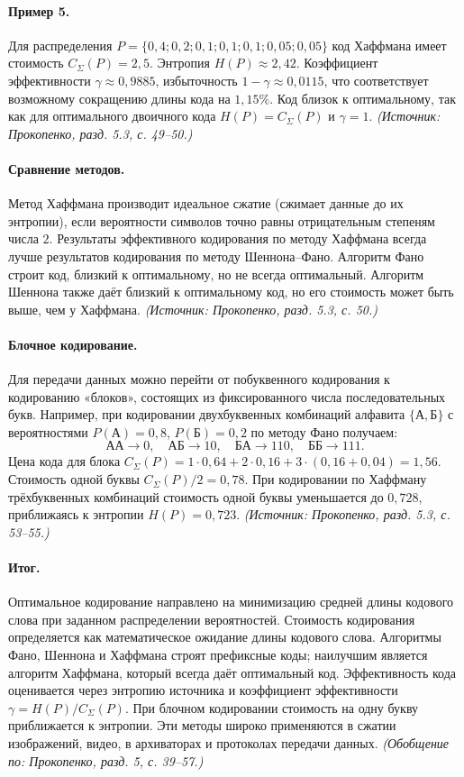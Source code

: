 \documentclass[a4paper,12pt]{article}
\begin{document}
\paragraph{Пример 5.}
Для распределения \(P=\{0{,}4;0{,}2;0{,}1;0{,}1;0{,}1;0{,}05;0{,}05\}\) код Хаффмана имеет стоимость \(C_\Sigma(P)=2{,}5\). Энтропия \(H(P)\approx2{,}42\). Коэффициент эффективности \(\gamma\approx0{,}9885\), избыточность \(1-\gamma\approx0{,}0115\), что соответствует возможному сокращению длины кода на \(1{,}15\%\). Код близок к оптимальному, так как для оптимального двоичного кода \(H(P)=C_\Sigma(P)\) и \(\gamma=1\).
\textit{(Источник: Прокопенко, разд. 5.3, с. 49--50.)}

\paragraph{Сравнение методов.}
Метод Хаффмана производит идеальное сжатие (сжимает данные до их энтропии), если вероятности символов точно равны отрицательным степеням числа \(2\). Результаты эффективного кодирования по методу Хаффмана всегда лучше результатов кодирования по методу Шеннона–Фано. Алгоритм Фано строит код, близкий к оптимальному, но не всегда оптимальный. Алгоритм Шеннона также даёт близкий к оптимальному код, но его стоимость может быть выше, чем у Хаффмана.
\textit{(Источник: Прокопенко, разд. 5.3, с. 50.)}

\paragraph{Блочное кодирование.}
Для передачи данных можно перейти от побуквенного кодирования к кодированию «блоков», состоящих из фиксированного числа последовательных букв. Например, при кодировании двухбуквенных комбинаций алфавита \(\{А,Б\}\) с вероятностями \(P(А)=0{,}8\), \(P(Б)=0{,}2\) по методу Фано получаем:
\[
АА\to 0,\quad АБ\to 10,\quad БА\to 110,\quad ББ\to 111.
\]
Цена кода для блока \(C_\Sigma(P)=1\cdot0{,}64+2\cdot0{,}16+3\cdot(0{,}16+0{,}04)=1{,}56\). Стоимость одной буквы \(C_\Sigma(P)/2=0{,}78\).
При кодировании по Хаффману трёхбуквенных комбинаций стоимость одной буквы уменьшается до \(0{,}728\), приближаясь к энтропии \(H(P)=0{,}723\).
\textit{(Источник: Прокопенко, разд. 5.3, с. 53--55.)}

\paragraph{Итог.}
Оптимальное кодирование направлено на минимизацию средней длины кодового слова при заданном распределении вероятностей. Стоимость кодирования определяется как математическое ожидание длины кодового слова. Алгоритмы Фано, Шеннона и Хаффмана строят префиксные коды; наилучшим является алгоритм Хаффмана, который всегда даёт оптимальный код. Эффективность кода оценивается через энтропию источника и коэффициент эффективности \(\gamma=H(P)/C_\Sigma(P)\). При блочном кодировании стоимость на одну букву приближается к энтропии. Эти методы широко применяются в сжатии изображений, видео, в архиваторах и протоколах передачи данных.
\textit{(Обобщение по: Прокопенко, разд. 5, с. 39--57.)}
\end{document}
